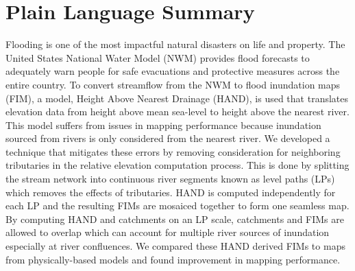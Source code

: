 \section*{Plain Language Summary}
Flooding is one of the most impactful natural disasters on life and property. 
The United States National Water Model (NWM) provides flood forecasts to adequately warn people for safe evacuations and protective measures across the entire country.
To convert streamflow from the NWM to flood inundation maps (FIM), a model, Height Above Nearest Drainage (HAND), is used that translates elevation data from height above mean sea-level to height above the nearest river.
This model suffers from issues in mapping performance because inundation sourced from rivers is only considered from the nearest river.
We developed a technique that mitigates these errors by removing consideration for neighboring tributaries in the relative elevation computation process.
This is done by splitting the stream network into continuous river segments known as level paths (LPs) which removes the effects of tributaries.
HAND is computed independently for each LP and the resulting FIMs are mosaiced together to form one seamless map.
By computing HAND and catchments on an LP scale, catchments and FIMs are allowed to overlap which can account for multiple river sources of inundation especially at river confluences.
We compared these HAND derived FIMs to maps from physically-based models and found improvement in mapping performance.
%
